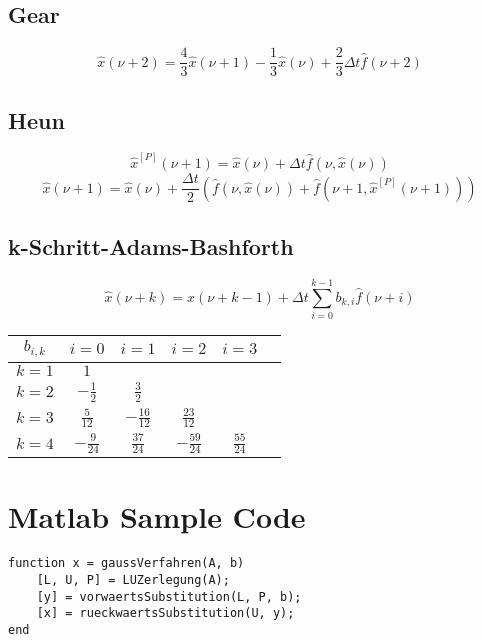 \documentclass[german]{latex4ei/latex4ei_fs}
\begin{document}
\begin{sectionbox}
\subsection{Gear}
\begin{equation*}
	\hat{x}(\nu + 2) = \frac{4}{3} \hat{x}(\nu + 1) - \frac{1}{3} \hat{x}(\nu) + \frac{2}{3} \Delta t \hat{f}(\nu + 2)
\end{equation*}

\subsection{Heun}
\begin{equation*}
	\hat{x}^{[P]}(\nu + 1) = \hat{x}(\nu) + \Delta t \hat{f}(\nu, \hat{x}(\nu))
\end{equation*}
\begin{equation*}
	\hat{x}(\nu + 1) = \hat{x}(\nu) + \frac{\Delta t}{2} \left( \hat{f}(\nu, \hat{x}(\nu)) + \hat{f}(\nu + 1, \hat{x}^{[P]}(\nu + 1)) \right)
\end{equation*}

\subsection{k-Schritt-Adams-Bashforth}
\begin{equation*}
	\hat x(\nu + k) = \hat x(\nu + k - 1) + \Delta t\sum_{i=0}^{k-1}b_{k,i}\hat f(\nu + i)
\end{equation*}
\begin{tabularx}{\columnwidth}{C|CCCCC}
$b_{i,k}$ & $i=0$ & $i=1$ & $i=2$ & $i=3$ \\ \hline
$k=1$ & $1$ & & & \\
$k=2$ & $-\frac{1}{2}$ & $\frac{3}{2}$ & & \\
$k=3$ & $\frac{5}{12}$ & $-\frac{16}{12}$ & $\frac{23}{12}$ & \\
$k=4$ & $-\frac{9}{24}$ & $\frac{37}{24}$ & $-\frac{59}{24}$ & $\frac{55}{24}$
\end{tabularx}
\end{sectionbox}

\section{Matlab Sample Code}
\begin{lstlisting}
function x = gaussVerfahren(A, b)
    [L, U, P] = LUZerlegung(A);
    [y] = vorwaertsSubstitution(L, P, b);
    [x] = rueckwaertsSubstitution(U, y);
end
\end{lstlisting}
\end{document}
